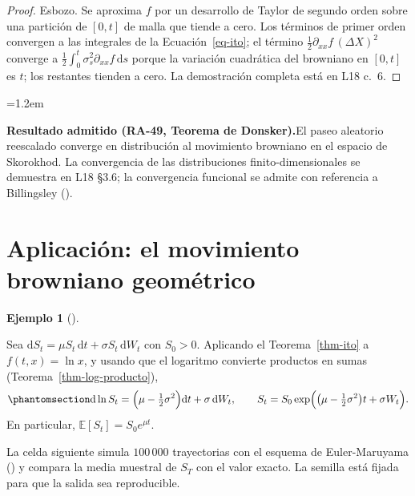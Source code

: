 \documentclass[
  spanish,
  letterpaper,
  a4paper,
  11pt,
  oneside,
  numbers=noenddot]{scrbook}
\newenvironment{atlasnota}{\par\medskip\begin{list}{}{\leftmargin=1.2em\rightmargin=0pt}\item\relax}{\end{list}\medskip}
\newcommand{\atlasnotatitulo}[1]{\textbf{#1.}\enspace}
\theoremstyle{definition}
\theoremstyle{plain}
\theoremstyle{definition}
\theoremstyle{definition}
\newtheorem{example}{Ejemplo}[chapter]
\theoremstyle{plain}
\theoremstyle{remark}
\begin{document}
\begin{proof}
Esbozo. Se aproxima \(f\) por un desarrollo de Taylor de segundo orden
sobre una partición de \([0, t]\) de malla que tiende a cero. Los
términos de primer orden convergen a las integrales de la
Ecuación~\ref{eq-ito}; el término
\(\tfrac{1}{2} \partial_{xx} f \, (\Delta X)^{2}\) converge a
\(\tfrac{1}{2} \int_0^t \sigma_s^{2} \partial_{xx} f \, \mathrm{d}s\)
porque la variación cuadrática del browniano en \([0, t]\) es \(t\); los
restantes tienden a cero. La demostración completa está en L18 c.~6.
\end{proof}

\begin{atlasnota}

\atlasnotatitulo{Resultado admitido (\mdseries RA-49, Teorema de Donsker)}El
paseo aleatorio reescalado converge en distribución al movimiento
browniano en el espacio de Skorokhod. La convergencia de las
distribuciones finito-dimensionales se demuestra en L18 §3.6; la
convergencia funcional se admite con referencia a Billingsley
().

\end{atlasnota}

\section{Aplicación: el movimiento browniano geométrico}\label{sec-mbg}

\begin{example}[]\protect\hypertarget{exm-mbg}{}\label{exm-mbg}

Sea
\(\mathrm{d}S_t = \mu S_t \, \mathrm{d}t + \sigma S_t \, \mathrm{d}W_t\)
con \(S_0 > 0\). Aplicando el Teorema~\ref{thm-ito} a
\(f(t, x) = \ln x\), y usando que el logaritmo convierte productos en
sumas (Teorema~\ref{thm-log-producto}),
\begin{equation}\protect\phantomsection\label{eq-mbg}{
\mathrm{d} \ln S_t = \Bigl( \mu - \tfrac{1}{2} \sigma^{2} \Bigr) \mathrm{d}t + \sigma \, \mathrm{d}W_t ,
\qquad
S_t = S_0 \exp\Bigl( \bigl(\mu - \tfrac{1}{2}\sigma^{2}\bigr) t + \sigma W_t \Bigr).
}\end{equation} En particular, \(\mathbb{E}[S_t] = S_0 e^{\mu t}\).

\end{example}

La celda siguiente simula \(100\,000\) trayectorias con el esquema de
Euler-Maruyama () y
compara la media muestral de \(S_T\) con el valor exacto. La semilla
está fijada para que la salida sea reproducible.
\end{document}
